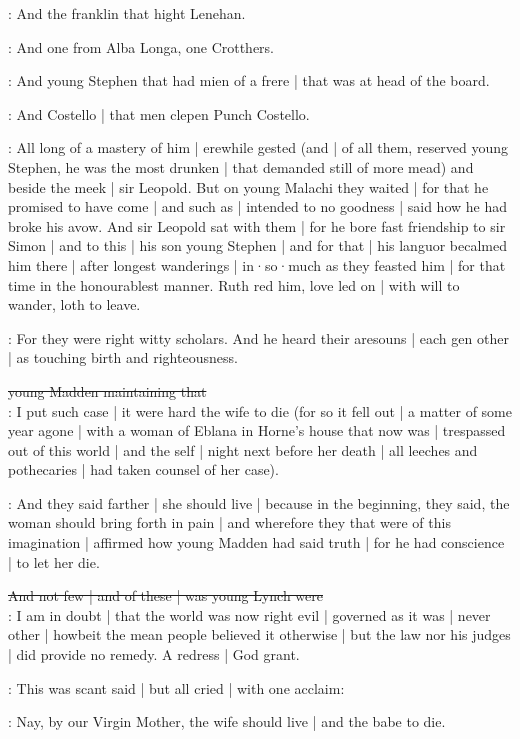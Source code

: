 :
And the franklin that hight Lenehan.

:
And one from Alba Longa,
one Crotthers.

:
And young Stephen
that had mien of a frere |
that was at head of the board.

:
And Costello |
that men clepen Punch Costello.

:
All long of a mastery of him |
erewhile gested
(and |
of all them,
reserved young Stephen,
he was the most drunken |
that demanded still of more mead)
and beside the meek |
sir Leopold.
But on young Malachi they waited |
for that he promised to have come |
and such as |
intended to no goodness |
said how he had broke his avow.
And sir Leopold sat with them |
for he bore fast friendship to sir Simon |
and to this |
his son young Stephen |
and for that |
his languor becalmed him there |
after longest wanderings |
in·so·much as they feasted him |
for that time in the honourablest manner.
Ruth red him,
love led on |
with will to wander,
loth to leave.


:
For they were right witty scholars.
And he heard their aresouns |
each gen other |
as touching birth and righteousness.

\sout{young Madden maintaining that}\\
\madden:
I put such case |
it were hard the wife to die
(for so it fell out |
a matter of some year agone |
with a woman of Eblana in Horne's house that now was |
trespassed out of this world |
and the self |
night next before her death |
all leeches and pothecaries |
had taken counsel of her case).

:
And they said farther |
she should live |
because in the beginning,
they said,
the woman should bring forth in pain |
and wherefore they that were of this imagination |
affirmed how young Madden had said truth |
for he had conscience |
to let her die.

\sout{And not few |
and of these |
was young Lynch were}\\
\lynch:
I am in doubt |
that the world was now right evil |
governed as it was |
never other |
howbeit the mean people believed it otherwise |
but the law nor his judges |
did provide no remedy.
A redress |
God grant.

:
This was scant said |
but all cried |
with one acclaim:

\All:
Nay,
by our Virgin Mother,
the wife should live |
and the babe to die.

